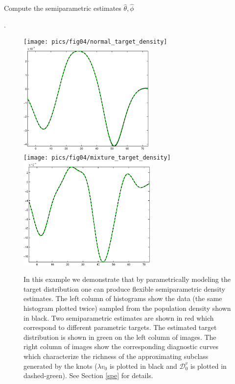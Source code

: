 \documentclass[noinfoline]{imsart}
\begin{document}
\begin{algorithm}[h!]
\caption{Compute the semiparametric estimates $\hat\theta, \hat \phi$} 
\label{alg2} 
\begin{algorithmic}[1]
.
\end{algorithmic}
\end{algorithm}


\begin{figure}[t]
\centering
\texttt{[image: pics/fig04/normal\_target\_density]}
\includegraphics[height = 2.2in]{pics/fig04/normal_target_agreement0}\\
\texttt{[image: pics/fig04/mixture\_target\_density]}
\includegraphics[height = 2.2in]{pics/fig04/mixture_target_agreement0}
\caption{ 
In this example we demonstrate that by parametrically modeling the target distribution one can  produce flexible semiparametric density estimates. 
The left column of histograms show the data (the same histogram plotted twice) sampled from the population density shown in black. Two semiparametric estimates are shown in red which correspond to different parametric targets. The estimated target distribution is shown in green on the left column of images. The right column of images show the corresponding  diagnostic curves which characterize the richness of the approximating subclass generated by the knots ($\lambda v_0$ is plotted in  black and $\mathcal D_0^v$ is plotted in dashed-green).  See Section \ref{spe} for details. 
 \label{f4} }
 \end{figure}
\end{document}
